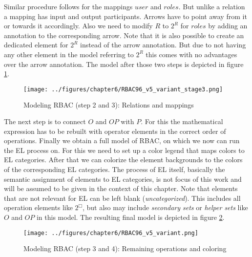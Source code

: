 \documentclass[twoside, openright, 12pt]{book}
\begin{document}
%
Similar procedure follows for the mappings $user$ and $roles$.
But unlike a relation a mapping has input and output participants.
Arrows have to point away from it or towards it accordingly.
Also we need to modify $R$ to $2^R$ for $roles$ by adding an annotation to the corresponding arrow.
Note that it is also possible to create an dedicated element for $2^R$ instead of the arrow annotation.
But due to not having any other element in the model referring to $2^R$ this comes with no advantages over the arrow annotation.
The model after those two steps is depicted in figure \ref{fig:RBAC96_v5_variant_stage3}.

\begin{figure}[htb]
	\centering
	\texttt{[image: ../figures/chapter6/RBAC96\_v5\_variant\_stage3.png]}
	\caption{Modeling RBAC (step 2 and 3): Relations and mappings}
	\label{fig:RBAC96_v5_variant_stage3}
\end{figure}

\noindent
The next step is to connect $O$ and $\mathit{OP}$ with $P$.
For this the mathematical expression has to be rebuilt with operator elements in the correct order of operations.
Finally we obtain a full model of RBAC, on which we now can run the EL process on.
For this we need to set up a color legend that maps colors to EL categories.
After that we can colorize the element backgrounds to the colors of the corresponding EL categories.
The process of EL itself, basically the semantic assignment of elements to EL categories, is not focus of this work and will be assumed to be given in the context of this chapter.
Note that elements that are not relevant for EL can be left blank (\textit{uncategorized}).
This includes all operation elements like $2^{\Box}$, but also may include \textit{secondary sets} or \textit{helper sets} like $O$ and $\mathit{OP}$ in this model.
The resulting final model is depicted in figure \ref{fig:RBAC96_v5_variant}.

\begin{figure}[htb]
	\centering
	\texttt{[image: ../figures/chapter6/RBAC96\_v5\_variant.png]}
	\caption{Modeling RBAC (step 3 and 4): Remaining operations and coloring}
	\label{fig:RBAC96_v5_variant}
\end{figure}
\end{document}

